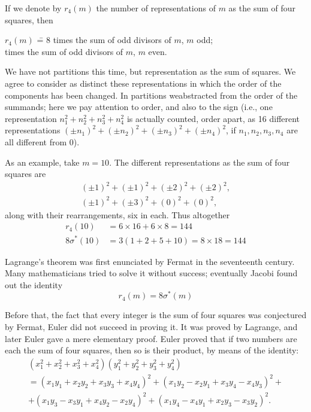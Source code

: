If we denote by $r_4(m)$ the number of representations of $m$ as the
sum of four squares, then 

\begin{tabbing}
  $r_4(m)$ \= = 8 times the sum of odd divisors of $m$, $m$ odd;\\
  \>  times the sum of odd divisors of $m$, $m$ even.
\end{tabbing}

We have not partitions this time, but representation as the sum of
squares. We agree to consider as distinct these representations in
which the order of the components has been changed. In partitions
we\pageoriginale abstracted from the order of the summands; here we
pay attention to order, and also to the sign (i.e., one representation
$n_1^2 + n_2^2 + n_3^2 +n_4^2$ is actually counted, order apart, as 16
different representations $(\pm n_1)^2 + (\pm n_2)^2 +(\pm n_3)^2+(\pm
n_4)^2$, if $n_1, n_2, n_3, n_4$ are all different from 0).

As an example, take $m=10$. The different representations as the sum
of four squares are 
\begin{gather*}
  (\pm 1)^2 + (\pm 1)^2 + (\pm 2)^2 + (\pm 2)^2,\\
  (\pm 1)^2+ (\pm 3)^2+ (0)^2+ (0)^2,
\end{gather*}
along with their rearrangements, six in each. Thus altogether
\begin{align*}
  r_4 (10) & = 6 \times 16 + 6\times 8 = 144\\
  8 \sigma^* (10) & = 3(1+2+5+10) = 8 \times 18 = 144
\end{align*}

Lagrange's theorem was first enunciated by Fermat in the seventeenth
century. Many mathematicians tried to solve it without success;
eventually Jacobi found out the identity
$$
r_4 (m) = 8 \sigma^* (m)
$$

Before that, the fact that every integer is the sum of four squares
was conjectured by Fermat, Euler did not succeed in proving it. It was
proved by Lagrange, and later Euler gave a mere elementary
proof. Euler proved that if two numbers are each the sum of four
squares, then so is their product, by means of the identity:
\begin{multline*}
  (x_1^2 + x_2^2 + x_3^2 + x_4^2)(y_1^2 + y_2^2 + y_3^2+ y_4^2)\\
  = (x_1 y_1+ x_2y_2+ x_3 y_3 + x_4 y_4)^2 + (x_1 y_2- x_2y_1 + x_3
  y_4 - x_4 y_3)^2 +\\
  + (x_1y_3 - x_3 y_1 + x_4y_2 - x_2 y_4)^2 + (x_1y_4- x_4 y_1 + x_2
  y_3 - x_3 y_2)^2.
\end{multline*}

